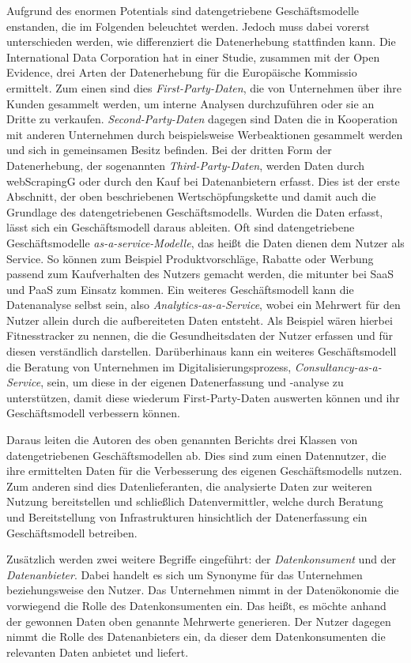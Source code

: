 \noindent Aufgrund des enormen Potentials sind datengetriebene Geschäftsmodelle enstanden, die im Folgenden beleuchtet werden. Jedoch muss dabei vorerst unterschieden werden, wie differenziert die Datenerhebung stattfinden kann. Die International Data Corporation hat in einer Studie, zusammen mit der Open Evidence, drei Arten der Datenerhebung für die Europäische Kommissio ermittelt. Zum einen sind dies \textit{First-Party-Daten}, die von Unternehmen über ihre Kunden gesammelt werden, um interne Analysen durchzuführen oder sie an Dritte zu verkaufen. \textit{Second-Party-Daten} dagegen sind Daten die in Kooperation mit anderen Unternehmen durch beispielsweise Werbeaktionen gesammelt werden und sich in gemeinsamen Besitz befinden. Bei der dritten Form der Datenerhebung, der sogenannten \textit{Third-Party-Daten}, werden Daten durch \gls{webScrapingG} oder durch den Kauf bei Datenanbietern erfasst. Dies ist der erste Abschnitt, der oben beschriebenen Wertschöpfungskette und damit auch die Grundlage des datengetriebenen Geschäftsmodells. Wurden die Daten erfasst, lässt sich ein Geschäftsmodell daraus ableiten. Oft sind datengetriebene Geschäftsmodelle \textit{\glqq as-a-service\grqq{}-Modelle}, das heißt die Daten dienen dem Nutzer als Service. So können zum Beispiel Produktvorschläge, Rabatte oder Werbung passend zum Kaufverhalten des Nutzers gemacht werden, die mitunter bei \gls{SaaS} und \gls{PaaS} zum Einsatz kommen. Ein weiteres Geschäftsmodell kann die Datenanalyse selbst sein, also \textit{Analytics-as-a-Service}, wobei ein Mehrwert für den Nutzer allein durch die aufbereiteten Daten entsteht. Als Beispiel wären hierbei Fitnesstracker zu nennen, die die Gesundheitsdaten der Nutzer erfassen und für diesen verständlich darstellen. Darüberhinaus kann ein weiteres Geschäftsmodell die Beratung von Unternehmen im Digitalisierungsprozess, \textit{Consultancy-as-a-Service}, sein, um diese in der eigenen Datenerfassung und -analyse zu unterstützen, damit diese wiederum First-Party-Daten auswerten können und ihr Geschäftsmodell verbessern können. \newline

\noindent Daraus leiten die Autoren des oben genannten Berichts drei Klassen von datengetriebenen Geschäftsmodellen ab. Dies sind zum einen Datennutzer, die ihre ermittelten Daten für die Verbesserung des eigenen Geschäftsmodells nutzen. Zum anderen sind dies Datenlieferanten, die analysierte Daten zur weiteren Nutzung bereitstellen und schließlich Datenvermittler, welche durch Beratung und Bereitstellung von Infrastrukturen hinsichtlich der Datenerfassung ein Geschäftsmodell betreiben. \cite{smart_2013} \newline

\noindent Zusätzlich werden zwei weitere Begriffe eingeführt: der \textit{Datenkonsument} und der \textit{Datenanbieter}. Dabei handelt es sich um Synonyme für das Unternehmen beziehungsweise den Nutzer. Das Unternehmen nimmt in der Datenökonomie die vorwiegend die Rolle des Datenkonsumenten ein. Das heißt, es möchte anhand der gewonnen Daten oben genannte Mehrwerte generieren. Der Nutzer dagegen nimmt die Rolle des Datenanbieters ein, da dieser dem Datenkonsumenten die relevanten Daten anbietet und liefert. 